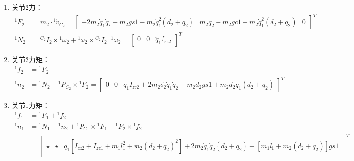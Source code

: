 \documentclass[
12pt, %
a4paper, 
oneside, %
headinclude,footinclude, %
]{scrartcl}
\begin{document}
{\begin{enumerate}
\begin{align*}
{}^1 \dot{v}_2 &= {}^1 \dot{v}_1 + {}^1 \dot{\omega}_1 \times {}^1 P_2 + {}^1 \omega_1 \times ({}^1 \omega_1 \times {}^1 P_2) + \ddot{q}_2 \cdot {}^1 Z_2 + 2\dot{q}_2 \cdot {}^1 \omega_1 \times {}^1 Z_2 \\
&= \begin{bmatrix} -\ddot{q}_1 q_2 - 2\dot{q}_1 \dot{q}_2 + gs1 & -\dot{q}_1^2 q_2 + {\ddot{q}_2}^2 + gc1 & 0 \end{bmatrix}^T \\
{}^1 \dot{v}_{C_2} &= {}^1 \dot{v}_2 + {}^1 \dot{\omega}_2 \times {}^1 P_{C_2} + {}^1 \omega_2 \times ({}^1 \omega_2 \times {}^1 P_{C_2}) \\
&= \begin{bmatrix} -2\dot{q}_1 \dot{q}_2 + gs1 - \ddot{q}_1(d_2 + q_2) & \ddot{q}_2 + gc1 - \dot{q}_1^2(d_2 + q_2) & 0 \end{bmatrix}^T
\end{align*}
\item 关节$ 2 $力：
\begin{align*}
{}^1 F_2 &= m_2 \cdot {}^1 \dot{v}_{C_2} = \begin{bmatrix} -2m_2 \dot{q}_1 \dot{q}_2 + m_2 gs1 - m_2 \dot{q}_1^2 (d_2 + q_2) & m_2 \ddot{q}_2 + m_2 gc1 - m_2 \dot{q}_1^2 (d_2 + q_2) & 0 \end{bmatrix}^T \\
{}^1 N_2 &= {}^{C_2}I_2 \times {}^1 \dot{\omega}_2 + {}^1 \omega_2 \times {}^{C_2}I_2 \cdot {}^1 \omega_2 = \begin{bmatrix} 0 & 0 & \ddot{q}_1 I_{zz2} \end{bmatrix}^T
\end{align*}
\item 关节$ 2 $力矩：
\begin{align*}
{}^1 f_2 &= {}^1 F_2 \\
{}^1 n_2 &= {}^1 N_2 + {}^1 P_{C_2} \times {}^1 F_2 = \begin{bmatrix} 0 & 0 & \ddot{q}_1 I_{zz2} + 2m_2 d_2 \dot{q}_1 \dot{q}_2 - m_2 d_2 gs1 + m_2 d_2 \ddot{q}_1 (d_2 + q_2) \end{bmatrix}^T
\end{align*}
\item 关节$ 1 $力矩：
\begin{align*}
{}^1 f_1 &= {}^1 F_1 + {}^1 f_2 \\
{}^1 n_1 &= {}^1 N_1 + {}^1 n_2 + {}^1 P_{C_1} \times {}^1 F_1 + {}^1 P_2 \times {}^1 f_2 \\
&= \begin{bmatrix} \star & \star & \ddot{q}_1[I_{zz2} + I_{zz1} + m_1 l_1^2 + m_2(d_2 + q_2)^2] + 2m_2 \dot{q}_1 \dot{q}_2(d_2 + q_2) - [m_1 l_1 + m_2(d_2 + q_2)]gs1 \end{bmatrix}^T

\end{align*}
\end{enumerate}}
\end{document}
